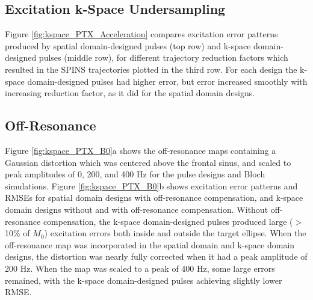 \subsection*{Excitation k-Space Undersampling}
Figure \ref{fig:kspace_PTX_Acceleration} compares excitation error patterns produced by spatial domain-designed pulses (top row)
and k-space domain-designed pulses (middle row),
for different trajectory reduction factors which resulted in the SPINS trajectories plotted in the third row. 
For each design the k-space domain-designed pulses had higher error, 
but error increased smoothly with increasing reduction factor, as it did for the spatial domain designs. 




\subsection*{Off-Resonance}
Figure \ref{fig:kspace_PTX_B0}a shows the off-resonance maps containing a Gaussian distortion which was centered above the frontal sinus,
and scaled to peak amplitudes of 0, 200, and 400 Hz for the pulse designs and Bloch simulations. 
Figure \ref{fig:kspace_PTX_B0}b shows excitation error patterns and RMSEs for spatial domain designs with off-resonance compensation,
and k-space domain designs without and with off-resonance compensation. 
Without off-resonance compensation, 
the k-space domain-designed pulses produced large ($>$ 10\% of $M_0$) excitation errors both inside and outside the target ellipse. 
When the off-resonance map was incorporated in the spatial domain and k-space domain designs, 
the distortion was nearly fully corrected when it had a peak amplitude of 200 Hz. 
When the map was scaled to a peak of 400 Hz, some large errors remained, with the k-space domain-designed pulses achieving slightly lower RMSE. 
